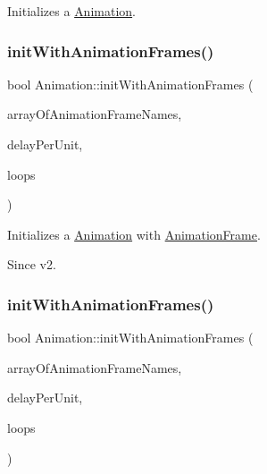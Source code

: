 Initializes a \hyperlink{classAnimation}{Animation}. \mbox{\label{classAnimation_a1115db3100f35d146137bab1f3f384d6}} 
\subsubsection{\texorpdfstring{init\+With\+Animation\+Frames()}{initWithAnimationFrames()}\hspace{0.1cm}{\footnotesize\ttfamily [1/2]}}
{\footnotesize\ttfamily bool Animation\+::init\+With\+Animation\+Frames (\begin{DoxyParamCaption}\item[{const \hyperlink{classVector}{Vector}$<$ \hyperlink{classAnimationFrame}{Animation\+Frame} $\ast$$>$ \&}]{array\+Of\+Animation\+Frame\+Names,  }\item[{float}]{delay\+Per\+Unit,  }\item[{unsigned int}]{loops }\end{DoxyParamCaption})}

Initializes a \hyperlink{classAnimation}{Animation} with \hyperlink{classAnimationFrame}{Animation\+Frame}. \begin{DoxySince}{Since}
v2. 
\end{DoxySince}
\mbox{\label{classAnimation_a1115db3100f35d146137bab1f3f384d6}} 
\subsubsection{\texorpdfstring{init\+With\+Animation\+Frames()}{initWithAnimationFrames()}\hspace{0.1cm}{\footnotesize\ttfamily [2/2]}}
{\footnotesize\ttfamily bool Animation\+::init\+With\+Animation\+Frames (\begin{DoxyParamCaption}\item[{const \hyperlink{classVector}{Vector}$<$ \hyperlink{classAnimationFrame}{Animation\+Frame} $\ast$$>$ \&}]{array\+Of\+Animation\+Frame\+Names,  }\item[{float}]{delay\+Per\+Unit,  }\item[{unsigned int}]{loops }\end{DoxyParamCaption})}

